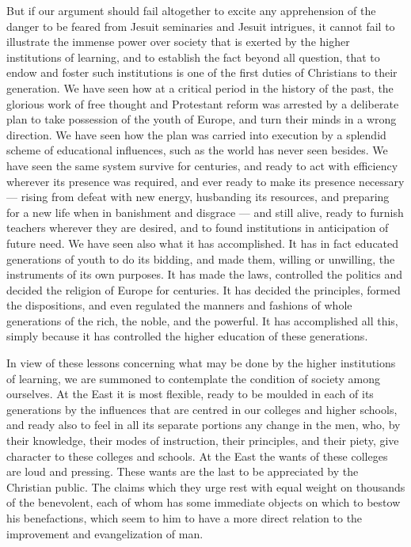 \documentclass[]{book}
\begin{document}
But if our argument should fail altogether to excite any apprehension of the danger to be feared from Jesuit seminaries and Jesuit intrigues, it cannot fail to illustrate the immense power over society that is exerted by the higher institutions of learning, and to establish the fact beyond all question, that to endow and foster such institutions is one of the first duties of Christians to their generation. We have seen how at a critical period in the history of the past, the glorious work of free thought and Protestant reform was arrested by a deliberate plan to take possession of the youth of Europe, and turn their minds in a wrong direction. We have seen how the plan was carried into execution by a splendid scheme of educational influences, such as the world has never seen besides. We have seen the same system survive for centuries, and ready to act with efficiency wherever its presence was required, and ever ready to make its presence necessary --- rising from defeat with new energy, husbanding its resources, and preparing for a new life when in banishment and disgrace --- and still alive, ready to furnish teachers wherever they are desired, and to found institutions in anticipation of future need. We have seen also what it has accomplished. It has in fact educated generations of youth to do its bidding, and made them, willing or unwilling, the instruments of its own purposes. It has made the laws, controlled the politics and decided the religion of Europe for centuries. It has decided the principles, formed the dispositions, and even regulated the manners and fashions of whole generations of the rich, the noble, and the powerful. It has accomplished all this, simply because it has controlled the higher education of these generations.

In view of these lessons concerning what may be done by the higher institutions of learning, we are summoned to contemplate the condition of society among ourselves. At the East it is most flexible, ready to be moulded in each of its generations by the influences that are centred in our colleges and higher schools, and ready also to feel in all its separate portions any change in the men, who, by their knowledge, their modes of instruction, their principles, and their piety, give character to these colleges and schools. At the East the wants of these colleges are loud and pressing. These wants are the last to be appreciated by the Christian public. The claims which they urge rest with equal weight on thousands of the benevolent, each of whom has some immediate objects on which to bestow his benefactions, which seem to him to have a more direct relation to the improvement and evangelization of man.
\end{document}
